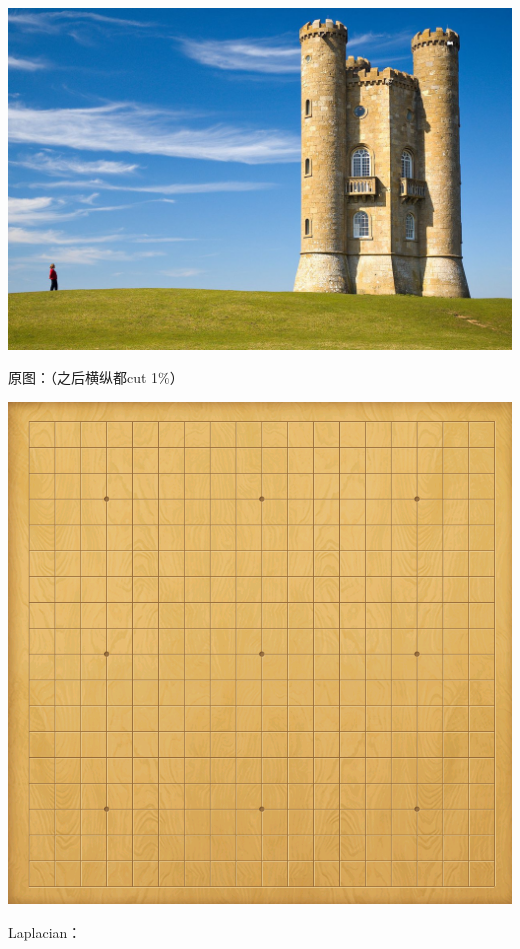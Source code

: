 \documentclass[10pt, a4paper]{article}
\begin{document}
    \includegraphics[scale = .3]{1sobel.jpg}

    原图：（之后横纵都cut 1$\%$）

    \includegraphics[scale = .2]{2.png}

    Laplacian：
\end{document}
